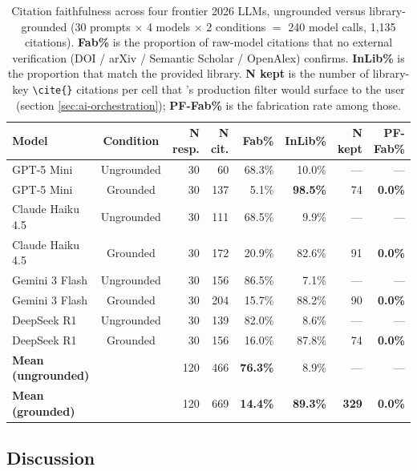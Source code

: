 \begin{table}[h]
\centering
\caption{Citation faithfulness across four frontier 2026 LLMs, ungrounded versus library-grounded (30 prompts $\times$ 4 models $\times$ 2 conditions $=$ 240 model calls, 1{,}135 citations). \textbf{Fab\%} is the proportion of raw-model citations that no external verification (DOI / arXiv / Semantic Scholar / OpenAlex) confirms. \textbf{InLib\%} is the proportion that match the provided library. \textbf{N kept} is the number of library-key \texttt{\textbackslash cite\{\}} citations per cell that \sh{}'s production filter would surface to the user (section \ref{sec:ai-orchestration}); \textbf{PF-Fab\%} is the fabrication rate among those.}
\label{tab:study1-results}
\footnotesize
\setlength{\tabcolsep}{4pt}
\begin{tabular}{@{}l c r r r r r r@{}}
\toprule
\textbf{Model} & \textbf{Condition} & \textbf{N resp.} & \textbf{N cit.} & \textbf{Fab\%} & \textbf{InLib\%} & \textbf{N kept} & \textbf{PF-Fab\%} \\
\midrule
GPT-5 Mini       & Ungrounded & 30 & 60  & 68.3\% &  10.0\% & --- & --- \\
GPT-5 Mini       & Grounded   & 30 & 137 &  5.1\% & \textbf{98.5\%} &  74 & \textbf{0.0\%} \\
\midrule
Claude Haiku 4.5 & Ungrounded & 30 & 111 & 68.5\% &   9.9\% & --- & --- \\
Claude Haiku 4.5 & Grounded   & 30 & 172 & 20.9\% & 82.6\% &  91 & \textbf{0.0\%} \\
\midrule
Gemini 3 Flash   & Ungrounded & 30 & 156 & 86.5\% &   7.1\% & --- & --- \\
Gemini 3 Flash   & Grounded   & 30 & 204 & 15.7\% & 88.2\% &  90 & \textbf{0.0\%} \\
\midrule
DeepSeek R1      & Ungrounded & 30 & 139 & 82.0\% &   8.6\% & --- & --- \\
DeepSeek R1      & Grounded   & 30 & 156 & 16.0\% & 87.8\% &  74 & \textbf{0.0\%} \\
\midrule
\textbf{Mean (ungrounded)} &  & 120 & 466 & \textbf{76.3\%} &  8.9\% & --- & --- \\
\textbf{Mean (grounded)}   &  & 120 & 669 & \textbf{14.4\%} & \textbf{89.3\%} & \textbf{329} & \textbf{0.0\%} \\
\bottomrule
\end{tabular}
\end{table}

\subsection{Discussion}

